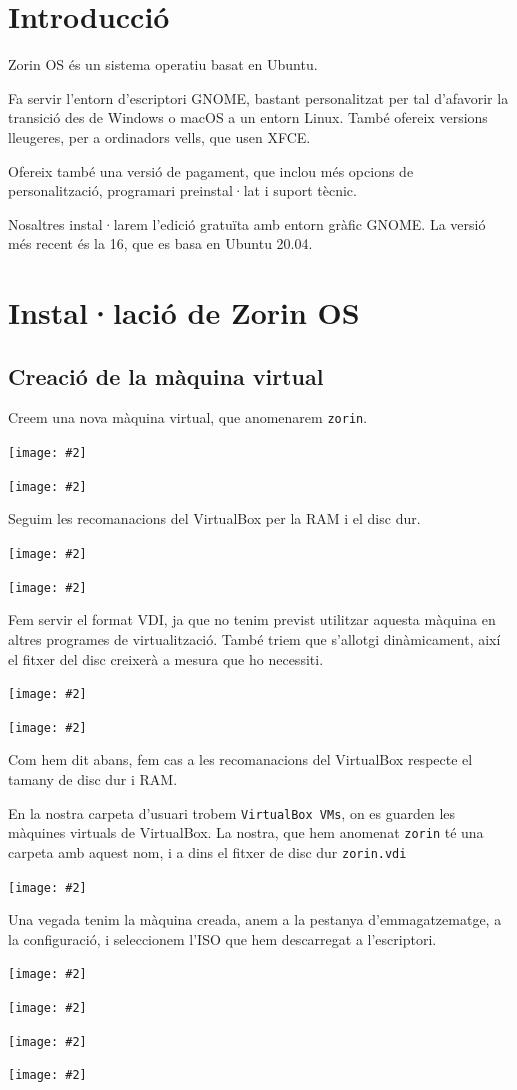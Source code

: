 \documentclass[a4paper,12pt]{article}
\newcommand{\mygraphic}[2][width=0.9\textwidth]{\begin{center}
		\centering\texttt{[image: \#2]}\par
\end{center}}
\begin{document}


\tableofcontents
\newpage

\section{Introducció}
Zorin OS és un sistema operatiu basat en Ubuntu.

Fa servir l'entorn d'escriptori GNOME, bastant personalitzat per tal d'afavorir la transició des de Windows o macOS a un entorn Linux.
També ofereix versions lleugeres, per a ordinadors vells, que usen XFCE.

Ofereix també una versió de pagament, que inclou més opcions de personalització, programari preinstal·lat i suport tècnic.

Nosaltres instal·larem l'edició gratuïta amb entorn gràfic GNOME. La versió més recent és la 16, que es basa en Ubuntu 20.04.

\newpage
\section{Instal·lació de Zorin OS}
\subsection{Creació de la màquina virtual}
Creem una nova màquina virtual, que anomenarem \texttt{zorin}. 
\mygraphic{imatges/a1.png}
\mygraphic{imatges/a2.png}

\newpage
Seguim les recomanacions del VirtualBox per la RAM i el disc dur.
\mygraphic{imatges/a3.png}
\mygraphic{imatges/a4.png}

\newpage
Fem servir el format VDI, ja que no tenim previst utilitzar aquesta màquina en altres programes de virtualització. També triem que s'allotgi dinàmicament, així el fitxer del disc creixerà a mesura que ho necessiti.
\mygraphic[height=0.4\textheight]{imatges/a5.png}
\mygraphic[height=0.4\textheight]{imatges/a6.png}

\newpage
Com hem dit abans, fem cas a les recomanacions del VirtualBox respecte el tamany de disc dur i RAM.

En la nostra carpeta d'usuari trobem \texttt{VirtualBox VMs}, on es guarden les màquines virtuals de VirtualBox. La nostra, que hem anomenat \texttt{zorin} té una carpeta amb aquest nom, i a dins el fitxer de disc dur \texttt{zorin.vdi}
\mygraphic{imatges/a7.png}

\newpage
Una vegada tenim la màquina creada, anem a la pestanya d'emmagatzematge, a la configuració, i seleccionem l'ISO que hem descarregat a l'escriptori.
\mygraphic{imatges/a8.png}
\mygraphic{imatges/a9.png}
\mygraphic{imatges/a10.png}
\mygraphic{imatges/a11.png}
\end{document}
